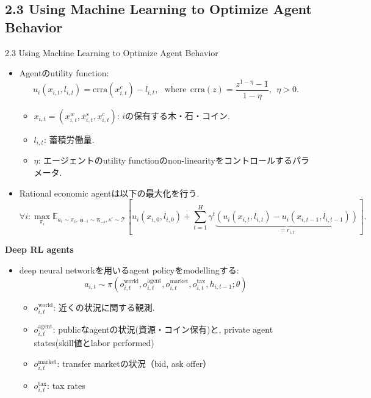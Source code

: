 \documentclass[unicode,aspectratio=169,11pt]{beamer}
\begin{document}
\subsection{2.3 Using Machine Learning to Optimize Agent Behavior}
\begin{frame}{2.3 Using Machine Learning to Optimize Agent Behavior}{}
    \begin{itemize}
        \item Agentのutility function:
        \[
            u_i(x_{i,t}, l_{i,t}) = \mathrm{crra}\left(x_{i,t}^c \right) - l_{i,t},
            \ \ \ \mathrm{where}\ \ \mathrm{crra}(z) = \frac{z^{1-\eta} - 1}{1-\eta},\ \ \eta>0.
            \tag{2}
        \]
        \begin{itemize}
            \item $x_{i,t} = (x_{i,t}^w, x_{i,t}^s, x_{i,t}^c)$: $i$の保有する木・石・コイン.
            \item $l_{i,t}$: 蓄積労働量.
            \item $\eta$: エージェントのutility functionのnon-linearityをコントロールするパラメータ.
        \end{itemize}
        \item Rational economic agentは以下の最大化を行う.
        \[
            \forall i : \max_{\pi_i} \mathbb{E}_{a_i \sim \pi_i,\ \bm{a}_{-i}\sim \bm{\pi}_{-i}, s'\sim \mathscr{T}}
            \left[u_i(x_{i,0}, l_{i,0}) + \sum_{t=1}^H\gamma^t \underbrace{\left(u_i(x_{i,t}, l_{i,t})-u_i(x_{i,t-1}, l_{i,t-1})\right)}_{=r_{i,t}}\right].
            \tag{3}
        \]
    \end{itemize}
\end{frame}

\begin{frame}{}{}
{\bf Deep RL agents}
\begin{itemize}
    \item deep neural networkを用いるagent policyをmodellingする:
    \[ a_{i,t} \sim \pi(o^{\mathrm{world}}_{i,t}, o^{\mathrm{agent}}_{i,t}, o^{\mathrm{market}}_{i,t}, o^{\mathrm{tax}}_{i,t}, h_{i,t-1};\theta) \]
    \begin{itemize}
        \item $o^{\mathrm{world}}_{i,t}$: 近くの状況に関する観測.
        \item $o^{\mathrm{agent}}_{i,t}$: publicなagentの状況(資源・コイン保有)と, private agent states(skill値とlabor performed)
        \item $o^{\mathrm{market}}_{i,t}$: transfer marketの状況（bid, ask offer）
        \item $o^{\mathrm{tax}}_{i,t}$: tax rates
    \end{itemize}
\end{itemize}
\end{frame}
\end{document}
